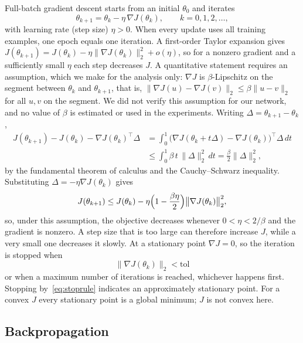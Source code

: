 Full-batch gradient descent starts from an initial $\theta_0$ and iterates
\begin{equation}
  \theta_{k+1}=\theta_k-\eta\,\nabla J(\theta_k),\qquad k=0,1,2,\dots,
  \label{eq:gd}
\end{equation}
with learning rate (step size) $\eta>0$. When every update uses all training examples, one epoch equals one iteration. A first-order Taylor expansion gives $J(\theta_{k+1})=J(\theta_k)-\eta\lVert\nabla J(\theta_k)\rVert_2^{2}+o(\eta)$, so for a nonzero gradient and a sufficiently small $\eta$ each step decreases $J$. A quantitative statement requires an assumption, which we make for the analysis only: $\nabla J$ is $\beta$-Lipschitz on the segment between $\theta_k$ and $\theta_{k+1}$, that is, $\lVert\nabla J(u)-\nabla J(v)\rVert_2\le\beta\lVert u-v\rVert_2$ for all $u,v$ on the segment. We did not verify this assumption for our network, and no value of $\beta$ is estimated or used in the experiments. Writing $\Delta=\theta_{k+1}-\theta_k$,
\begin{align*}
  J(\theta_{k+1})-J(\theta_k)-\nabla J(\theta_k)^{\top}\Delta
  &=\int_0^1\bigl(\nabla J(\theta_k+t\Delta)-\nabla J(\theta_k)\bigr)^{\top}\Delta\,dt\\
  &\le\int_0^1\beta\,t\,\lVert\Delta\rVert_2^{2}\,dt=\frac{\beta}{2}\lVert\Delta\rVert_2^{2},
\end{align*}
by the fundamental theorem of calculus and the Cauchy--Schwarz inequality. Substituting $\Delta=-\eta\nabla J(\theta_k)$ gives
\begin{equation}
  J(\theta_{k+1})\le J(\theta_k)-\eta\Bigl(1-\frac{\beta\eta}{2}\Bigr)\bigl\lVert\nabla J(\theta_k)\bigr\rVert_2^{2},
  \label{eq:descent}
\end{equation}
so, under this assumption, the objective decreases whenever $0<\eta<2/\beta$ and the gradient is nonzero. A step size that is too large can therefore increase $J$, while a very small one decreases it slowly. At a stationary point $\nabla J=0$, so the iteration is stopped when
\begin{equation}
  \bigl\lVert\nabla J(\theta_k)\bigr\rVert_2<\mathrm{tol}
  \label{eq:stoprule}
\end{equation}
or when a maximum number of iterations is reached, whichever happens first. Stopping by~\eqref{eq:stoprule} indicates an approximately stationary point. For a convex $J$ every stationary point is a global minimum; $J$ is not convex here.

\subsection{Backpropagation}
\label{sec:prelim-bp}

